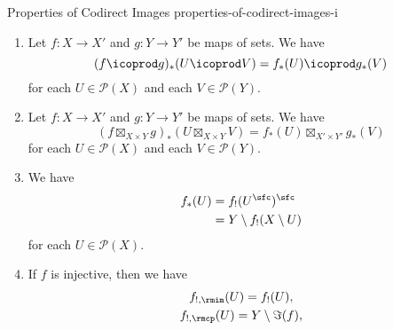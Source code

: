 \begin{proposition}{Properties of Codirect Images \rmI}{properties-of-codirect-images-i}
\begin{enumerate}
            \[
                (f_{*},f^{\otimes}_{*},f^{\otimes}_{!|\Unit})
                \colon
                (\mathcal{P}(X),\cap,X)
                \to
                (\mathcal{P}(Y),\cap,Y),
            \]%
            being equipped with equalities%
            \[
                \begin{gathered}
                    f^{\otimes}_{!|U,V}   \colon f_{*}(U\cap V) \rightequalsarrow f_{*}(U)\cap f_{*}(V),\\
                    f^{\otimes}_{!|\Unit} \colon f_{*}(X)       \rightequalsarrow Y,
                \end{gathered}
            \]%
            natural in $U,V\in\mathcal{P}(X)$.
        \item\label{properties-of-codirect-images-i-interaction-with-coproducts}Let $f\colon X\to X'$ and $g\colon Y\to Y'$ be maps of sets. We have
            \[
                (f\icoprod g)_{*}(U\icoprod V)%
                =%
                f_{*}(U)\icoprod g_{*}(V)%
            \]%
            for each $U\in\mathcal{P}(X)$ and each $V\in\mathcal{P}(Y)$.
        \item\label{properties-of-codirect-images-i-interaction-with-products}Let $f\colon X\to X'$ and $g\colon Y\to Y'$ be maps of sets. We have
            \[
                (f\boxtimes_{X\times Y} g)_{*}(U\boxtimes_{X\times Y}V)%
                =%
                f_{*}(U)\boxtimes_{X'\times Y'}g_{*}(V)%
            \]%
            for each $U\in\mathcal{P}(X)$ and each $V\in\mathcal{P}(Y)$.
        \item\label{properties-of-codirect-images-i-relation-to-direct-images}We have
            \begin{align*}
                f_{*}(U) &= f_{!}(U^{\sfc})^{\sfc}\\
                         &= Y\setminus f_{!}(X\setminus U)
            \end{align*}
            for each $U\in\mathcal{P}(X)$.
        \item\label{properties-of-codirect-images-i-interaction-with-injections}If $f$ is injective, then we have
            \begin{gather*}
                f_{!,\rmim}(U) = f_{!}(U),\\
                f_{!,\rmcp}(U) = Y\setminus\Im(f),\\
                \begin{aligned}

\end{aligned}
\end{gather*}
\end{enumerate}
\end{proposition}
